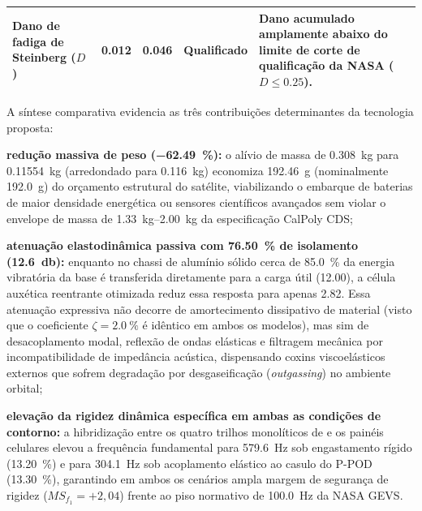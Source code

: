 \begin{table}[htb]
\begin{tabularx}{\textwidth}{@{}>{\raggedright\arraybackslash}p{3.2cm} >{\centering\arraybackslash}p{1.8cm} >{\centering\arraybackslash}p{1.8cm} >{\centering\arraybackslash}p{2.0cm} >{\raggedright\arraybackslash}X@{}}
    Dano de fadiga de Steinberg ($D$) & \num{0.012} & \num{0.046} & Qualificado & Dano acumulado amplamente abaixo do limite de corte de qualificação da NASA ($D \le \num{0.25}$). \\
    \bottomrule
  \end{tabularx}
\end{table}

A síntese comparativa evidencia as três contribuições determinantes da tecnologia proposta:
\begin{alineas}
  \item \textbf{redução massiva de peso (\SI{-62.49}{\percent}):} o alívio de massa de \SI{0.308}{\kilo\gram} para \SI{0.11554}{\kilo\gram} (arredondado para \SI{0.116}{\kilo\gram}) economiza \SI{192.46}{\gram} (nominalmente \SI{192.0}{\gram}) do orçamento estrutural do satélite, viabilizando o embarque de baterias de maior densidade energética ou sensores científicos avançados sem violar o envelope de massa de \SIrange{1.33}{2.00}{\kilo\gram} da especificação CalPoly CDS;
  \item \textbf{atenuação elastodinâmica passiva com \SI{76.50}{\percent} de isolamento (\SI{12.6}{\decibel}):} enquanto no chassi de alumínio sólido cerca de \SI{85.0}{\percent} da energia vibratória da base é transferida diretamente para a carga útil (\SI{12.00}{\Grms}), a célula auxética reentrante otimizada reduz essa resposta para apenas \SI{2.82}{\Grms}. Essa atenuação expressiva não decorre de amortecimento dissipativo de material (visto que o coeficiente $\zeta = \SI{2.0}{\percent}$ é idêntico em ambos os modelos), mas sim de desacoplamento modal, reflexão de ondas elásticas e filtragem mecânica por incompatibilidade de impedância acústica, dispensando coxins viscoelásticos externos que sofrem degradação por desgaseificação (\textit{outgassing}) no ambiente orbital;
  \item \textbf{elevação da rigidez dinâmica específica em ambas as condições de contorno:} a hibridização entre os quatro trilhos monolíticos de \rail{} e os painéis celulares elevou a frequência fundamental para \SI{579.6}{\hertz} sob engastamento rígido (\SI{+13.20}{\percent}) e para \SI{304.1}{\hertz} sob acoplamento elástico ao casulo do P-POD (\SI{+13.30}{\percent}), garantindo em ambos os cenários ampla margem de segurança de rigidez ($MS_{f_1} = +2{,}04$) frente ao piso normativo de \SI{100.0}{\hertz} da NASA GEVS.
\end{alineas}

